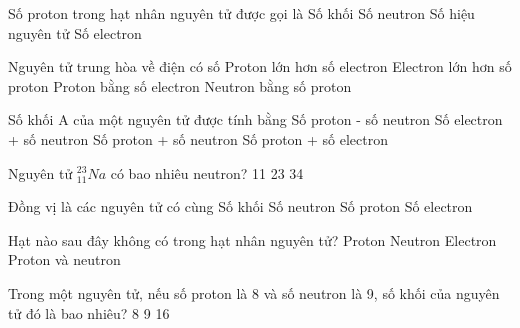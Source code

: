 \begin{ex}
	Số proton trong hạt nhân nguyên tử được gọi là
	\choice
	{Số khối}
	{Số neutron}
	{\True Số hiệu nguyên tử}
	{Số electron}
\end{ex}

\begin{ex}
	Nguyên tử trung hòa về điện có số
	\choice
	{Proton lớn hơn số electron}
	{Electron lớn hơn số proton}
	{\True Proton bằng số electron}
	{Neutron bằng số proton}
\end{ex}

\begin{ex}
	Số khối A của một nguyên tử được tính bằng
	\choice
	{Số proton - số neutron}
	{Số electron + số neutron}
	{\True Số proton + số neutron}
	{Số proton + số electron}
\end{ex}

\begin{ex}
	Nguyên tử ${^{23}_{11}Na}$ có bao nhiêu neutron?
	\choice
	{11}
	{}
	{23}
	{34}
\end{ex}

\begin{ex}
	Đồng vị là các nguyên tử có cùng
	\choice
	{Số khối}
	{Số neutron}
	{\True Số proton}
	{Số electron}
\end{ex}

\begin{ex}
	Hạt nào sau đây không có trong hạt nhân nguyên tử?
	\choice
	{Proton}
	{Neutron}
	{\True Electron}
	{Proton và neutron}
\end{ex}

\begin{ex}
	Trong một nguyên tử, nếu số proton là 8 và số neutron là 9, số khối của nguyên tử đó là bao nhiêu?
	\choice
	{8}
	{9}
	{16}
	{}
\end{ex}

